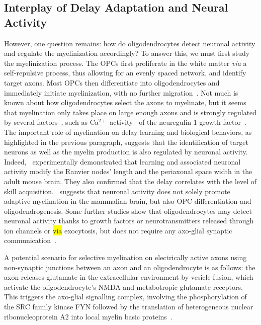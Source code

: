 \documentclass[brainsci, %
               review,accept,pdftex,moreauthors
               ]{Definitions/mdpi}
\begin{document}
\subsection{Interplay of Delay Adaptation and Neural Activity}
However, one question remains: how do oligodendrocytes detect neuronal activity and regulate the myelinization accordingly? To answer this, we must first study the myelinization process. The OPCs first proliferate in the white matter \textit{via} a self-repulsive process, thus allowing for an evenly spaced network, and identify target axons. Most OPCs then differentiate into oligodendrocytes and immediately initiate myelinization, with no further migration~\citep{simons_oligodendrocytes_2016}. Not much is known about how oligodendrocytes select the axons to myelinate, but it seems that myelination only takes place on large enough axons and is strongly regulated by several factors~\citep{kuhn_oligodendrocytes_2019}, such as Ca$^{2+}$ activity~\citep{baraban_ca2_2018} of the neuregulin 1 growth factor~\citep{nave_axonal_2006}. The important role of myelination on delay learning and biological behaviors, as highlighted in the previous paragraph, suggests that the identification of target neurons as well as the myelin production is also regulated by neuronal activity. Indeed,~\citet{cullen_periaxonal_2021} experimentally demonstrated that learning and associated neuronal activity modify the Ranvier nodes' length and the periaxonal space width in the adult mouse brain. They also confirmed that the delay correlates with the level of skill acquisition.~\citet{gibson_neuronal_2014} suggests that neuronal activity does not solely promote adaptive myelination in the mammalian brain, but also OPC differentiation and oligodendrogenesis. Some further studies show that oligodendrocytes may detect neuronal activity thanks to growth factors or neurotransmitters released through ion channels or {\hl{via}} exocytosis, but does not require any axo-glial synaptic communication~\citep{fields_new_2015}. 

A potential scenario for selective myelination on electrically active axons using non-synaptic junctions between an axon and an oligodendrocyte is as follows: the axon releases glutamate in the extracellular environment by vesicle fusion, which activate the oligodendrocyte's NMDA and metabotropic glutamate receptors. This triggers the axo-glial signalling complex, involving the phosphorylation of the SRC family kinase FYN followed by the translation of heterogeneous nuclear ribonucleoprotein A2 into local myelin basic proteins~\citep{fields_new_2015}.
\end{document}
